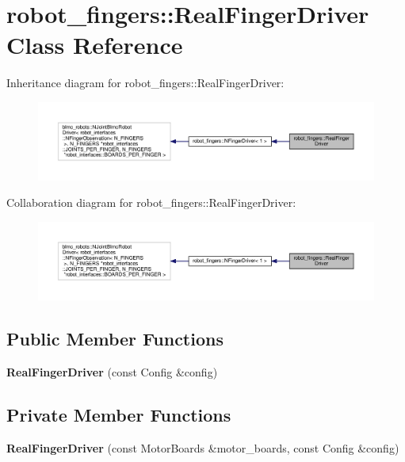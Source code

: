 \hypertarget{classrobot__fingers_1_1RealFingerDriver}{}\section{robot\+\_\+fingers\+:\+:Real\+Finger\+Driver Class Reference}
\label{classrobot__fingers_1_1RealFingerDriver}


Inheritance diagram for robot\+\_\+fingers\+:\+:Real\+Finger\+Driver\+:
\nopagebreak
\begin{figure}[H]
\begin{center}
\leavevmode
\includegraphics[width=350pt]{classrobot__fingers_1_1RealFingerDriver__inherit__graph}
\end{center}
\end{figure}


Collaboration diagram for robot\+\_\+fingers\+:\+:Real\+Finger\+Driver\+:
\nopagebreak
\begin{figure}[H]
\begin{center}
\leavevmode
\includegraphics[width=350pt]{classrobot__fingers_1_1RealFingerDriver__coll__graph}
\end{center}
\end{figure}
\subsection*{Public Member Functions}
\begin{DoxyCompactItemize}
\item 
\mbox{\label{classrobot__fingers_1_1RealFingerDriver_ab34c50dd9e303384802d7ee3fdaf01f3}} 
{\bfseries Real\+Finger\+Driver} (const Config \&config)
\end{DoxyCompactItemize}
\subsection*{Private Member Functions}
\begin{DoxyCompactItemize}
\item 
\mbox{\label{classrobot__fingers_1_1RealFingerDriver_a1e61688bf10e52d63a6497d24ad9012d}} 
{\bfseries Real\+Finger\+Driver} (const Motor\+Boards \&motor\+\_\+boards, const Config \&config)
\end{DoxyCompactItemize}
